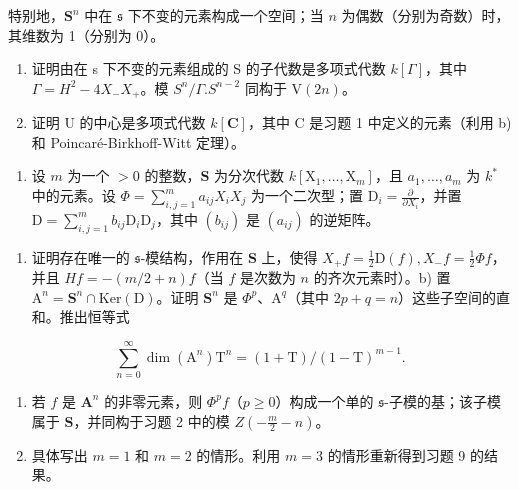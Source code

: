 特别地，\(\mathbf{S}^n\) 中在 \(\mathfrak{s}\) 下不变的元素构成一个空间；当 \(n\) 为偶数（分别为奇数）时，其维数为 1（分别为 0）。

\begin{enumerate}
\def\labelenumi{\alph{enumi})}
\setcounter{enumi}{1}
\item
  证明由在 s 下不变的元素组成的 S 的子代数是多项式代数 \(k[\Gamma]\)，其中 \(\Gamma = H^{2} - 4X_{-}X_{+}\)。模 \(S^{n}/\Gamma.S^{n-2}\) 同构于 \(\mathrm{V}(2n)\)。
\item
  证明 U 的中心是多项式代数 \(k[\mathbf{C}]\)，其中 C 是习题 1 中定义的元素（利用 b) 和 Poincaré-Birkhoff-Witt 定理）。
\end{enumerate}

\begin{enumerate}
\def\labelenumi{\arabic{enumi})}
\setcounter{enumi}{9}
\tightlist
\item
  设 \(m\) 为一个 \(> 0\) 的整数，\(\mathbf{S}\) 为分次代数 \(k[\mathrm{X}_1, \ldots, \mathrm{X}_m]\)，且 \(a_1, \ldots, a_m\) 为 \(k^*\) 中的元素。设 \(\Phi = \sum_{i,j=1}^{m} a_{ij} X_i X_j\) 为一个二次型；置 \(\mathrm{D}_i = \frac{\partial}{\partial X_i}\)，并置 \(\mathrm{D} = \sum_{i,j=1}^{m} b_{ij} \mathrm{D}_i \mathrm{D}_j\)，其中 \((b_{ij})\) 是 \((a_{ij})\) 的逆矩阵。
\end{enumerate}

\begin{enumerate}
\def\labelenumi{\alph{enumi})}
\tightlist
\item
  证明存在唯一的 \(\mathfrak{s}\)-模结构，作用在 \(\mathbf{S}\) 上，使得 \(X_{+}f = \frac{1}{2}\mathrm{D}(f), X_{-}f = \frac{1}{2}\Phi f\)，并且 \(Hf = -(m / 2 + n)f\)（当 \(f\) 是次数为 \(n\) 的齐次元素时）。b) 置 \(\mathrm{A}^n = \mathbf{S}^n \cap \mathrm{Ker}(\mathrm{D})\)。证明 \(\mathbf{S}^n\) 是 \(\Phi^p\)、\(\mathrm{A}^q\)（其中 \(2p + q = n\)）这些子空间的直和。推出恒等式
\end{enumerate}

\[
\sum_ {n = 0} ^ {\infty} \dim (\mathrm{A} ^ {n}) \mathrm{T} ^ {n} = (1 + \mathrm{T}) / (1 - \mathrm{T}) ^ {m - 1}.
\]

\begin{enumerate}
\def\labelenumi{\alph{enumi})}
\setcounter{enumi}{2}
\item
  若 \(f\) 是 \(\mathbf{A}^n\) 的非零元素，则 \(\varPhi^p f\)（\(p \geq 0\)）构成一个单的 \(\mathfrak{s}\)-子模的基；该子模属于 \(\mathbf{S}\)，并同构于习题 2 中的模 \(Z\left(-\frac{m}{2} - n\right)\)。
\item
  具体写出 \(m = 1\) 和 \(m = 2\) 的情形。利用 \(m = 3\) 的情形重新得到习题 9 的结果。
\end{enumerate}

